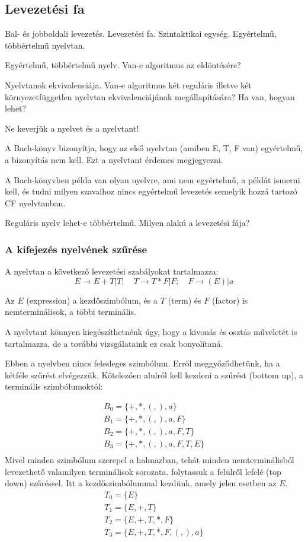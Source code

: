 \documentclass[a4paper]{article}
\begin{document}
\subsection{Levezetési fa}

Bal- és jobboldali levezetés.
Levezetési fa. Szintaktikai egység.
Egyértelmű, többértelmű nyelvtan.

Egyértelmű, többértelmű nyelv. Van-e algoritmus az eldöntésére?

Nyelvtanok ekvivalenciája.
Van-e algoritmus két reguláris illetve két környezetfüggetlen nyelvtan
ekvivalenciájának megállapítására? Ha van, hogyan lehet?

Ne keverjük a nyelvet és a nyelvtant!

A Bach-könyv bizonyítja, hogy az első nyelvtan (amiben E, T, F van)
egyértelmű, a bizonyítás nem kell. Ezt a nyelvtant érdemes megjegyezni.

A Bach-könyvben példa van olyan nyelvre, ami nem egyértelmű, a példát
ismerni kell, és tudni milyen szavaihoz nincs egyértelmű levezetés
semelyik hozzá tartozó CF nyelvtanban.

Reguláris nyelv lehet-e többértelmű. Milyen alakú a levezetési fája?

\subsubsection{A kifejezés nyelvének szűrése}

A nyelvtan a következő levezetési szabályokat tartalmazza:
\[
 E\rightarrow E+T | T;\quad T\rightarrow T*F| F;\quad F\rightarrow (E)|a
\]

Az $E$ (expression) a kezdőszimbólum, és a $T$ (term) és $F$ (factor) is
nemterminálisok, a többi terminális.

A nyelvtant könnyen kiegészíthetnénk úgy, hogy a kivonás és osztás
műveletét is tartalmazza, de a további vizsgálataink ez csak
bonyolítaná.

Ebben a nyelvben nincs felesleges szimbólum. Erről meggyőződhetünk, ha a
kétféle szűrést elvégezzük. Kötelezően alulról kell kezdeni a szűrést
(bottom up), a
terminális szimbólumoktól:

\begin{eqnarray*}
    B_0 = \{+, *, (, ), a\} \\
    B_1 = \{+, *, (, ), a, F\} \\
    B_2 = \{+, *, (, ), a, F, T\} \\
    B_3 = \{+, *, (, ), a, F, T, E\} \\
\end{eqnarray*}
Mivel minden szimbólum szerepel a halmazban, tehát minden
nemterminálisból levezethető valamilyen terminálisok sorozata.
folytassuk a felülről lefelé (top down) szűréssel. Itt a
kezdőszimbólummal kezdünk, amely jelen esetben az $E$.
\begin{eqnarray*}
    T_0 = \{E\} \\
    T_1 = \{E, +, T\} \\
    T_2 = \{E, +, T, *, F\} \\
    T_3 = \{E, +, T, *, F, (, ), a\} \\
\end{eqnarray*}
\end{document}
